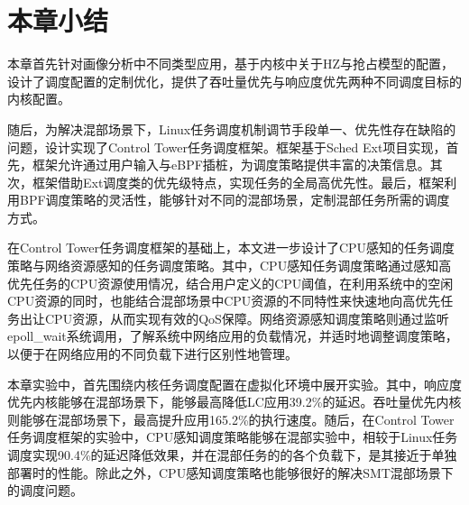 \section{本章小结}

本章首先针对画像分析中不同类型应用，基于内核中关于HZ与抢占模型的配置，设计了调度配置的定制优化，提供了吞吐量优先与响应度优先两种不同调度目标的内核配置。

随后，为解决混部场景下，Linux任务调度机制调节手段单一、优先性存在缺陷的问题，设计实现了Control Tower任务调度框架。框架基于Sched Ext项目实现，首先，框架允许通过用户输入与eBPF插桩，为调度策略提供丰富的决策信息。其次，框架借助Ext调度类的优先级特点，实现任务的全局高优先性。最后，框架利用BPF调度策略的灵活性，能够针对不同的混部场景，定制混部任务所需的调度方式。

在Control Tower任务调度框架的基础上，本文进一步设计了CPU感知的任务调度策略与网络资源感知的任务调度策略。其中，CPU感知任务调度策略通过感知高优先任务的CPU资源使用情况，结合用户定义的CPU阈值，在利用系统中的空闲CPU资源的同时，也能结合混部场景中CPU资源的不同特性来快速地向高优先任务出让CPU资源，从而实现有效的QoS保障。网络资源感知调度策略则通过监听epoll\_wait系统调用，了解系统中网络应用的负载情况，并适时地调整调度策略，以便于在网络应用的不同负载下进行区别性地管理。

本章实验中，首先围绕内核任务调度配置在虚拟化环境中展开实验。其中，响应度优先内核能够在混部场景下，能够最高降低LC应用39.2\%的延迟。吞吐量优先内核则能够在混部场景下，最高提升应用165.2\%的执行速度。随后，在Control Tower任务调度框架的实验中，CPU感知调度策略能够在混部实验中，相较于Linux任务调度实现90.4\%的延迟降低效果，并在混部任务的的各个负载下，是其接近于单独部署时的性能。除此之外，CPU感知调度策略也能够很好的解决SMT混部场景下的调度问题。
